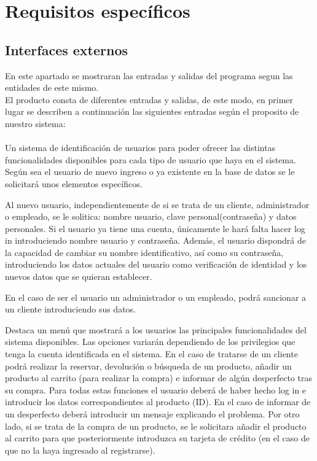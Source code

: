 \section{Requisitos específicos}
\label{sec:req_esp}
\subsection{Interfaces externos}
En este apartado se mostraran las entradas y salidas del programa segun las entidades de este mismo.\\

El producto consta de diferentes entradas y salidas, de este modo, en primer lugar se describen a continuación las siguientes entradas según el proposito de nuestro sistema:\\ \\
Un sistema de identificación de usuarios para poder ofrecer las distintas funcionalidades disponibles para cada tipo de usuario que haya en el sistema. Según sea el usuario de nuevo ingreso o ya existente en la base de datos se le solicitará unos elementos específicos.\vspace{5mm}

Al nuevo usuario, independientemente de si se trata de un cliente, administrador o empleado, se le solitica: nombre usuario, clave personal(contraseña) y datos personales. Si el usuario ya tiene una cuenta, únicamente le hará falta hacer log in introduciendo nombre usuario y contraseña. Además, el usuario dispondrá de la capacidad de cambiar su nombre identificativo, así como su contraseña, introduciendo los datos actuales del usuario como verificación de identidad y los nuevos datos que se quieran establecer.\vspace{5mm}

En el caso de ser el usuario un administrador o un empleado, podrá sancionar a un cliente introduciendo sus datos.\vspace{5mm}

Destaca un menú que mostrará a los usuarios las principales funcionalidades del sistema disponibles. Las opciones variarán dependiendo de los privilegios que tenga la cuenta identificada en el sistema. En el caso de tratarse de un cliente podrá realizar la reservar, devolución o búsqueda de un producto, añadir un producto al carrito (para realizar la compra) e informar de algún desperfecto tras su compra.
Para todas estas funciones el usuario deberá de haber hecho log in e introducir los datos correspondientes al producto (ID). En el caso de informar de un desperfecto deberá introducir un mensaje explicando el problema. Por otro lado, si se trata de la compra de un producto, se le solicitara añadir el producto al carrito para que posteriormente introduzca su tarjeta de crédito (en el caso de que no la haya ingresado al registrarse).\vspace{5mm}

